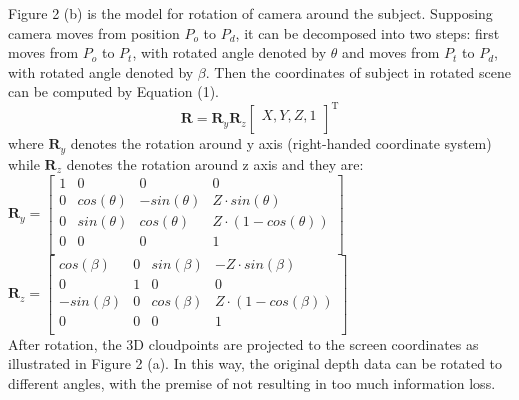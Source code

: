 \documentclass[conference]{IEEEtran}
\begin{document}
Figure 2 (b) is the model for rotation of camera around the subject. Supposing camera moves from position $P_{o}$ to $P_{d}$, it can be decomposed into two steps: first moves from $P_{o}$ to $P_{t}$, with rotated angle denoted by $\theta$ and moves from $P_{t}$ to $P_{d}$, with rotated angle denoted by $\beta$. Then the coordinates of subject in rotated scene can be computed by Equation (1).\\
\begin{equation}
\mathbf R  = \mathbf R_{y}\mathbf R_{z}
\begin{bmatrix}
 X, Y, Z, 1 \\
\end{bmatrix}^ \mathrm{ T }
\end{equation}
where $\mathbf R_{y}$ denotes the rotation around y axis (right-handed coordinate system) while $\mathbf R_{z}$ denotes the rotation around z axis and they are: \\
$\mathbf R_{y} =
\begin{bmatrix}
 1 & 0 & 0 & 0\\
 0 & cos(\theta) & -sin(\theta) & Z\cdot sin(\theta)\\
 0 & sin(\theta) & cos(\theta) & Z\cdot (1 - cos(\theta))\\
 0 & 0 & 0 & 1\\
\end{bmatrix}$\\
$\mathbf R_{z} =
\begin{bmatrix}
 cos(\beta) & 0 & sin(\beta) & -Z\cdot sin(\beta)\\
 0 & 1 & 0 & 0\\
 -sin(\beta) & 0 & cos(\beta) & Z\cdot (1 - cos(\beta))\\
 0 & 0 & 0 & 1\\
\end{bmatrix} $\\

%
%

After rotation, the 3D cloudpoints are projected to the screen coordinates as illustrated in Figure 2 (a). In this way, the original depth data can be rotated to different angles, with the premise of not resulting in too much information loss.
\end{document}
